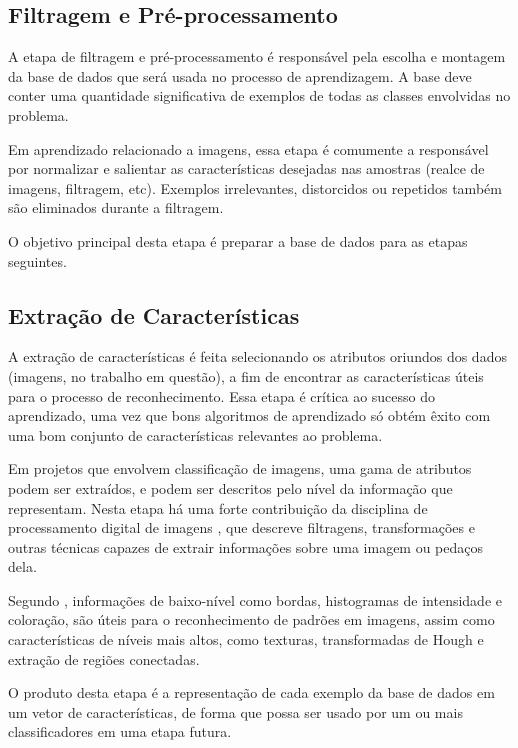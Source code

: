 \subsection{Filtragem e Pré-processamento}

A etapa de filtragem e pré-processamento é responsável pela escolha e montagem da base de dados que será usada no processo de aprendizagem. A base deve conter uma quantidade significativa de exemplos de todas as classes envolvidas no problema.

Em aprendizado relacionado a imagens, essa etapa é comumente a responsável por normalizar e salientar as características desejadas nas amostras (realce de imagens, filtragem, etc). Exemplos irrelevantes, distorcidos ou repetidos também são eliminados durante a filtragem.

O objetivo principal desta etapa é preparar a base de dados para as etapas seguintes.


\subsection{Extração de Características}

A extração de características é feita selecionando os atributos oriundos dos dados (imagens, no trabalho em questão), a fim de encontrar as características úteis para o processo de reconhecimento. Essa etapa é crítica ao sucesso do aprendizado, uma vez que bons algoritmos de aprendizado só obtém êxito com uma bom conjunto de características relevantes ao problema.

Em projetos que envolvem classificação de imagens, uma gama de atributos podem ser extraídos, e podem ser descritos pelo nível da informação que representam. Nesta etapa há uma forte contribuição da disciplina de processamento digital de imagens \cite{gonzalez:2002}, que descreve filtragens, transformações e outras técnicas capazes de extrair informações sobre uma imagem ou pedaços dela.

Segundo , informações de baixo-nível como bordas, histogramas de intensidade e coloração, são úteis para o reconhecimento de padrões em imagens, assim como características de níveis mais altos, como texturas, transformadas de Hough e extração de regiões conectadas.

O produto desta etapa é a representação de cada exemplo da base de dados em um vetor de características, de forma que possa ser usado por um ou mais classificadores em uma etapa futura.


